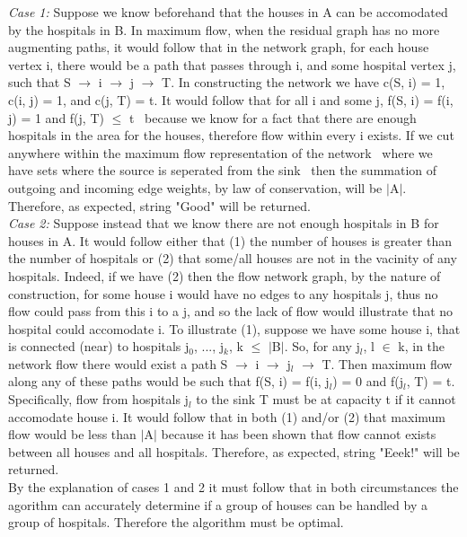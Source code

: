 \documentclass[10pt]{csc_assignment}
\begin{document}
\begin{description}
\emph{Case 1:} Suppose we know beforehand that the houses in A can be accomodated by the hospitals in B. In maximum flow, when the residual graph has no more augmenting paths, it would follow that in the network graph, for each house vertex i, there would be a path that passes through i, and some hospital vertex j, such that S $\rightarrow$ i $\rightarrow$ j $\rightarrow$ T. In constructing the network we have c(S, i) = 1, c(i, j) = 1, and c(j, T) = t. It would follow that for all i and some j, f(S, i) = f(i, j) = 1 and f(j, T) $\leqslant$ t \textemdash ~because we know for a fact that there are enough hospitals in the area for the houses, therefore flow within every i exists. If we cut anywhere within the maximum flow representation of the network \textemdash ~where we have sets where the source is seperated from the sink \textemdash ~then the summation of outgoing and incoming edge weights, by law of conservation, will be $\mid$A$\mid$. Therefore, as expected, string "Good" will be returned.\\    
\emph{Case 2:} Suppose instead that we know there are not enough hospitals in B for houses in A. It would follow either that (1) the number of houses is greater than the number of hospitals or (2) that some/all houses are not in the vacinity of any hospitals. Indeed, if we have (2) then the flow network graph, by the nature of construction, for some house i would have no edges to any hospitals j, thus no flow could pass from this i to a j, and so the lack of flow would illustrate that no hospital could accomodate i. To illustrate (1), suppose we have some house i, that is connected (near) to hospitals {j$_{0}$, ..., j$_{k}$}, k $\leqslant$ $\mid$B$\mid$. So, for any j$_{l}$, l $\in$ k, in the network flow there would exist a path S $\rightarrow$ i $\rightarrow$ j$_{l}$ $\rightarrow$ T. Then maximum flow along any of these paths would be such that f(S, i) = f(i, j$_{l}$) = 0 and f(j$_{l}$, T) = t. Specifically, flow from hospitals j$_{l}$ to the sink T must be at capacity t if it cannot accomodate house i. It would follow that in both (1) and/or (2) that maximum flow would be less than $\mid$A$\mid$ because it has been shown that flow cannot exists between all houses and all hospitals. Therefore, as expected, string "Eeek!" will be returned.\\ 
By the explanation of cases 1 and 2 it must follow that in both circumstances the agorithm can accurately determine if a group of houses can be handled by a group of hospitals. Therefore the algorithm must be optimal.        
\\
    

\end{description}
\end{document}
